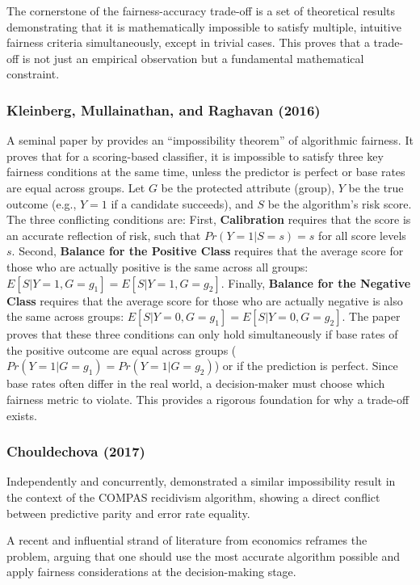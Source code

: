 \documentclass[12pt,a4paper]{article}
\theoremstyle{definition}
\theoremstyle{remark}
\begin{document}
The cornerstone of the fairness-accuracy trade-off is a set of theoretical results demonstrating that it is mathematically impossible to satisfy multiple, intuitive fairness criteria simultaneously, except in trivial cases. This proves that a trade-off is not just an empirical observation but a fundamental mathematical constraint.

\subsubsection{Kleinberg, Mullainathan, and Raghavan (2016)}

A seminal paper by \citet{Kleinberg2017} provides an ``impossibility theorem'' of algorithmic fairness. It proves that for a scoring-based classifier, it is impossible to satisfy three key fairness conditions at the same time, unless the predictor is perfect or base rates are equal across groups. Let $G$ be the protected attribute (group), $Y$ be the true outcome (e.g., $Y=1$ if a candidate succeeds), and $S$ be the algorithm's risk score. The three conflicting conditions are:
First, \textbf{Calibration} requires that the score is an accurate reflection of risk, such that $Pr(Y=1 | S=s) = s$ for all score levels $s$. Second, \textbf{Balance for the Positive Class} requires that the average score for those who are actually positive is the same across all groups: $E[S | Y=1, G=g_1] = E[S | Y=1, G=g_2]$. Finally, \textbf{Balance for the Negative Class} requires that the average score for those who are actually negative is also the same across groups: $E[S | Y=0, G=g_1] = E[S | Y=0, G=g_2]$.
The paper proves that these three conditions can only hold simultaneously if base rates of the positive outcome are equal across groups ($Pr(Y=1 | G=g_1) = Pr(Y=1 | G=g_2)$) or if the prediction is perfect. Since base rates often differ in the real world, a decision-maker must choose which fairness metric to violate. This provides a rigorous foundation for why a trade-off exists.

\subsubsection{Chouldechova (2017)}

Independently and concurrently, \citet{Chouldechova2017} demonstrated a similar impossibility result in the context of the COMPAS recidivism algorithm, showing a direct conflict between predictive parity and error rate equality.

A recent and influential strand of literature from economics reframes the problem, arguing that one should use the most accurate algorithm possible and apply fairness considerations at the decision-making stage.
\end{document}
